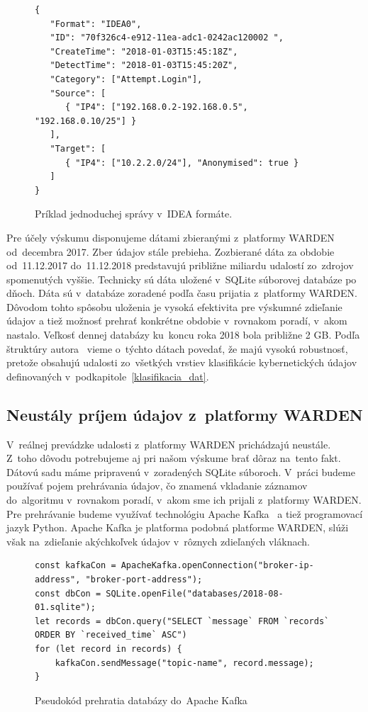 \documentclass[thesismargins, thesislinespacing, openright, upjsfrontpage]{rnthesis}
\begin{document}
\begin{figure}
    \begin{lstlisting}[]  
{
   "Format": "IDEA0",
   "ID": "70f326c4-e912-11ea-adc1-0242ac120002 ",
   "CreateTime": "2018-01-03T15:45:18Z",
   "DetectTime": "2018-01-03T15:45:20Z",
   "Category": ["Attempt.Login"],
   "Source": [
      { "IP4": ["192.168.0.2-192.168.0.5", "192.168.0.10/25"] }
   ],
   "Target": [
      { "IP4": ["10.2.2.0/24"], "Anonymised": true }
   ]
}
    \end{lstlisting}
    
    \caption{Príklad jednoduchej správy v~IDEA formáte.}
    \label{alg:idea}
\end{figure}

Pre účely výskumu disponujeme dátami zbieranými z~platformy WARDEN od~decembra 2017. Zber údajov stále prebieha. Zozbierané dáta za obdobie od~11.12.2017 do~11.12.2018 predstavujú približne miliardu udalostí zo~zdrojov spomenutých vyššie. Technicky sú dáta uložené v~SQLite súborovej databáze po dňoch. Dáta sú v~databáze zoradené podľa času prijatia z~platformy WARDEN. Dôvodom tohto spôsobu uloženia je vysoká efektivita pre výskumné zdieľanie údajov a tiež možnosť prehrať konkrétne obdobie v~rovnakom poradí, v~akom nastalo. Veľkosť dennej databázy ku~koncu roka 2018 bola približne 2 GB. Podľa štruktúry autora~\cite{wang2013cyber} vieme o~týchto dátach povedať, že majú vysokú robustnosť, pretože obsahujú udalosti zo~všetkých vrstiev klasifikácie kybernetických údajov definovaných v~podkapitole~\ref{klasifikacia_dat}.

\subsection{Neustály príjem údajov z~platformy WARDEN}

V~reálnej prevádzke udalosti z~platformy WARDEN prichádzajú neustále. Z~toho dôvodu potrebujeme aj pri našom výskume brať dôraz na~tento fakt. Dátovú sadu máme pripravenú v~zoradených SQLite súboroch. V~práci budeme používať pojem prehrávania údajov, čo znamená vkladanie záznamov do~algoritmu v~rovnakom poradí, v~akom sme ich prijali z~platformy WARDEN. Pre prehrávanie budeme využívať technológiu Apache Kafka~\cite{garg2013apache} a tiež programovací jazyk Python. Apache Kafka je platforma podobná platforme WARDEN, slúži však na~zdieľanie akýchkoľvek údajov v~rôznych zdieľaných vláknach. 

\begin{figure}
    \begin{lstlisting}[]  
const kafkaCon = ApacheKafka.openConnection("broker-ip-address", "broker-port-address");
const dbCon = SQLite.openFile("databases/2018-08-01.sqlite");
let records = dbCon.query("SELECT `message` FROM `records` ORDER BY `received_time` ASC")
for (let record in records) {
    kafkaCon.sendMessage("topic-name", record.message);
}
    \end{lstlisting}
    
    \caption{Pseudokód prehratia databázy do~Apache Kafka}
    \label{alg:prehratie}
\end{figure}
\end{document}
